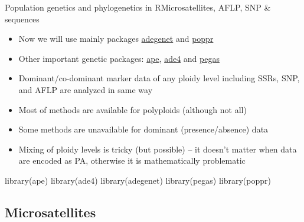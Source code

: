 \documentclass[compress, ucs, xelatex, 11pt, xcolor=svgnames,
  hyperref={
    bookmarks=true,
    unicode=true,
    colorlinks=true,
    pdftitle={Molecular data in R},
    plainpages=false,
    pdfauthor={Vojtech Zeisek},
    pdfsubject={Course about phylogeny and evolution in R},
    pdfcreator={XeLaTeX},
    pdfkeywords={R, evolution, phylogeny, molecular data},
    linkcolor=Tomato,
    anchorcolor=SaddleBrown,
    citecolor=Goldenrod,
    filecolor=DarkMagenta,
    menucolor=Sienna,
    urlcolor=DarkTurquoise,
    pdftex},
  url={hyphens, lowtilde} %
  ]{beamer}
\begin{document}
\begin{frame}[fragile]{Population genetics and phylogenetics in R}{Microsatellites, AFLP, SNP \& sequences}
  \begin{multicols}{2}
    \begin{itemize}
      \item Now we will use mainly packages \href{http://adegenet.r-forge.r-project.org/}{adegenet} and \href{http://grunwaldlab.cgrb.oregonstate.edu/poppr-r-package-population-genetics}{poppr}
      \item Other important genetic packages: \href{http://ape-package.ird.fr/}{ape}, \href{http://pbil.univ-lyon1.fr/ADE-4/}{ade4} and \href{http://ape-package.ird.fr/pegas.html}{pegas}
      \item Dominant/co-dominant marker data of any ploidy level including SSRs, SNP, and AFLP are analyzed in same way
      \item Most of methods are available for polyploids (although not all)
      \item Some methods are unavailable for dominant (presence/absence) data
      \item Mixing of ploidy levels is tricky (but possible) -- it doesn't matter when data are encoded as PA, otherwise it is mathematically problematic
    \end{itemize}
    \begin{spluscode}
      library(ape)
      library(ade4)
      library(adegenet)
      library(pegas)
      library(poppr)
    \end{spluscode}
  \end{multicols}
\end{frame}

\subsection{Microsatellites}
\end{document}
